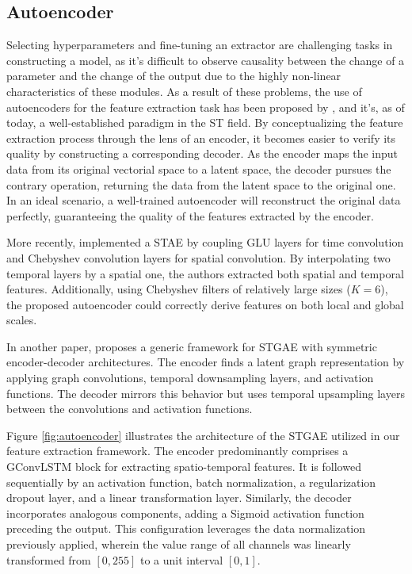 \subsection{Autoencoder}
 
Selecting hyperparameters and fine-tuning an extractor are challenging tasks in constructing a model, as it's difficult to observe causality between the change of a parameter and the change of the output due to the highly non-linear characteristics of these modules. As a result of these problems, the use of autoencoders for the feature extraction task has been proposed by \cite{Hinton2006}, and it's, as of today, a well-established paradigm in the \gls{ST} field. By conceptualizing the feature extraction process through the lens of an encoder, it becomes easier to verify its quality by constructing a corresponding decoder. As the encoder maps the input data from its original vectorial space to a latent space, the decoder pursues the contrary operation, returning the data from the latent space to the original one. In an ideal scenario, a well-trained autoencoder will reconstruct the original data perfectly, guaranteeing the quality of the features extracted by the encoder.
 
More recently, \cite{fan2023spatiotemporal} implemented a \gls{STAE} by coupling \gls{GLU} layers for time convolution and Chebyshev convolution layers for spatial convolution. By interpolating two temporal layers by a spatial one, the authors extracted both spatial and temporal features. Additionally, using Chebyshev filters of relatively large sizes ($K=6$), the proposed autoencoder could correctly derive features on both local and global scales.

In another paper, \cite{sabbaqi2022graph} proposes a generic framework for \gls{STGAE} with symmetric encoder-decoder architectures. The encoder finds a latent graph representation by applying graph convolutions, temporal downsampling layers, and activation functions. The decoder mirrors this behavior but uses temporal upsampling layers between the convolutions and activation functions. 
 
Figure \ref{fig:autoencoder} illustrates the architecture of the \gls{STGAE} utilized in our feature extraction framework. The encoder predominantly comprises a \gls{GConvLSTM} block for extracting spatio-temporal features. It is followed sequentially by an activation function, batch normalization, a regularization dropout layer, and a  linear transformation layer. Similarly, the decoder incorporates analogous components, adding a Sigmoid activation function preceding the output. This configuration leverages the data normalization previously applied, wherein the value range of all channels was linearly transformed from $[0, 255]$ to a unit interval $[0, 1]$.

